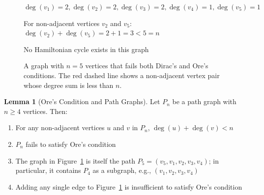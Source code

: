 \documentclass{article}
\theoremstyle{definition}
\newtheorem{lemma}{Lemma}
\begin{document}
\begin{figure}[h!]
\begin{center}
\end{center}

\vspace{0.5cm}
{\centering
\small $\deg(v_1) = 2, \deg(v_2) = 2, \deg(v_3) = 2, \deg(v_4) = 1, \deg(v_5) = 1$
\par}

\vspace{0.3cm}
{\centering
\small For non-adjacent vertices $v_2$ and $v_5$: $\deg(v_2) + \deg(v_5) = 2 + 1 = 3 < 5 = n$
\par}

\vspace{0.3cm}
{\centering
\small No Hamiltonian cycle exists in this graph
\par}
\caption{A graph with $n = 5$ vertices that fails both Dirac's and Ore's conditions. The red dashed line shows a non-adjacent vertex pair whose degree sum is less than $n$.}
\label{fig:ore-fails}
\end{figure}
\begin{lemma}[Ore's Condition and Path Graphs]
Let $P_n$ be a path graph with $n \geq 4$ vertices. Then:
\begin{enumerate}
    \item For any non-adjacent vertices $u$ and $v$ in $P_n$, $\deg(u) + \deg(v) < n$
    \item $P_n$ fails to satisfy Ore's condition
    \item The graph in Figure~\ref{fig:ore-fails} is itself the path $P_5 = (v_5, v_1, v_2, v_3, v_4)$; in particular, it contains $P_4$ as a subgraph, e.g., $(v_1, v_2, v_3, v_4)$
    \item Adding any single edge to Figure~\ref{fig:ore-fails} is insufficient to satisfy Ore's condition
\end{enumerate}
\end{lemma}
\end{document}
